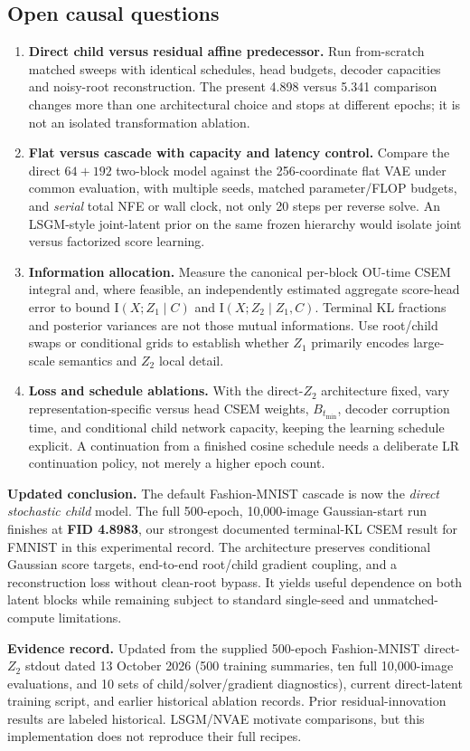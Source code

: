 \documentclass[10pt]{article}
\newcommand{\II}{\mathrm I}
\begin{document}
\subsection{Open causal questions}
\begin{enumerate}
\item \textbf{Direct child versus residual affine predecessor.} Run from-scratch matched sweeps with identical schedules, head budgets, decoder capacities and noisy-root reconstruction. The present 4.898 versus 5.341 comparison changes more than one architectural choice and stops at different epochs; it is not an isolated transformation ablation.
\item \textbf{Flat versus cascade with capacity and latency control.} Compare the direct $64+192$ two-block model against the 256-coordinate flat VAE under common evaluation, with multiple seeds, matched parameter/FLOP budgets, and \emph{serial} total NFE or wall clock, not only 20 steps per reverse solve. An LSGM-style joint-latent prior on the same frozen hierarchy would isolate joint versus factorized score learning.
\item \textbf{Information allocation.} Measure the canonical per-block OU-time CSEM integral and, where feasible, an independently estimated aggregate score-head error to bound $\II(X;Z_1\mid C)$ and $\II(X;Z_2\mid Z_1,C)$. Terminal KL fractions and posterior variances are not those mutual informations. Use root/child swaps or conditional grids to establish whether $Z_1$ primarily encodes large-scale semantics and $Z_2$ local detail.
\item \textbf{Loss and schedule ablations.} With the direct-$Z_2$ architecture fixed, vary representation-specific versus head CSEM weights, $B_{t_{\min}}$, decoder corruption time, and conditional child network capacity, keeping the learning schedule explicit. A continuation from a finished cosine schedule needs a deliberate LR continuation policy, not merely a higher epoch count.
\end{enumerate}

\textbf{Updated conclusion.} The default Fashion-MNIST cascade is now the \emph{direct stochastic child} model. The full 500-epoch, 10,000-image Gaussian-start run finishes at \textbf{FID 4.8983}, our strongest documented terminal-KL CSEM result for FMNIST in this experimental record. The architecture preserves conditional Gaussian score targets, end-to-end root/child gradient coupling, and a reconstruction loss without clean-root bypass. It yields useful dependence on both latent blocks while remaining subject to standard single-seed and unmatched-compute limitations.


\vfill
{\footnotesize\textbf{Evidence record.} Updated from the supplied 500-epoch Fashion-MNIST direct-$Z_2$ stdout dated 13 October 2026 (500 training summaries, ten full 10,000-image evaluations, and 10 sets of child/solver/gradient diagnostics), current direct-latent training script, and earlier historical ablation records. Prior residual-innovation results are labeled historical. LSGM/NVAE motivate comparisons, but this implementation does not reproduce their full recipes.}
\end{document}
